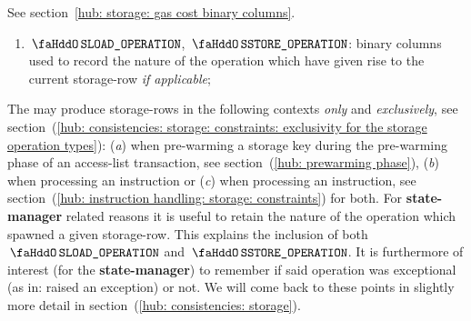 See section~\ref{hub: storage: gas cost binary columns}.
\begin{enumerate}[resume]
	\item
		$\stoSloadOperation$,
		$\stoSstoreOperation$:
		binary columns used to record the nature of the operation which have given rise to the current storage-row \emph{if applicable};
\end{enumerate}
\saNote{} \label{hub: storage rows: metadata for the state manager}
The \zkEvm{} may produce storage-rows in the following contexts \emph{only} and \emph{exclusively},
see section~(\ref{hub: consistencies: storage: constraints: exclusivity for the storage operation types}):
(\emph{a}) when pre-warming a storage key during the pre-warming phase of an access-list transaction, see section~(\ref{hub: prewarming phase}),
(\emph{b}) when processing an  instruction or
(\emph{c}) when processing an  instruction, see section~(\ref{hub: instruction handling: storage: constraints}) for both.
For \textbf{state-manager} related reasons it is useful to retain the nature of the operation which spawned a given storage-row.
This explains the inclusion of both $\stoSloadOperation$ and $\stoSstoreOperation$.
It is furthermore of interest (for the \textbf{state-manager}) to remember if said operation was exceptional (as in: raised an \evm{} exception) or not.
We will come back to these points in slightly more detail in section~(\ref{hub: consistencies: storage}).
